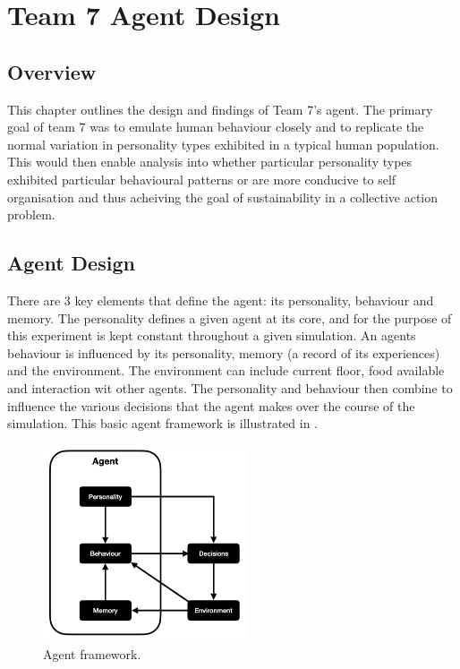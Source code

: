 \chapter{Team 7 Agent Design}\label{team_7_agent_design}

\section{Overview}
\label{sec: Team 7 Overview}
This chapter outlines the design and findings of Team 7's agent. The primary goal of team 7 was to emulate human behaviour closely and to replicate the normal variation in personality types exhibited in a typical human population. This would then enable analysis into whether particular personality types exhibited particular behavioural patterns or are more conducive to self organisation and thus acheiving the goal of sustainability in a collective action problem.

\section{Agent Design}
\label{sec: Agent Design}
There are 3 key elements that define the agent: its personality, behaviour and memory. The personality defines a given agent at its core, and for the purpose of this experiment is kept constant throughout a given simulation. An agents behaviour is influenced by its personality, memory (a record of its experiences) and the environment. The environment can include current floor, food available and interaction wit other agents. The personality and behaviour then combine to influence the various decisions that the agent makes over the course of the simulation. 
This basic agent framework is illustrated in .

\begin{figure}[H]
    \begin{center}
        \includegraphics[width=6cm]
        {009_team_7_agent_design/Images/agent_flow.png}
    \end{center}
    \caption{Agent framework.}
    \label{agent_flow}
\end{figure}

